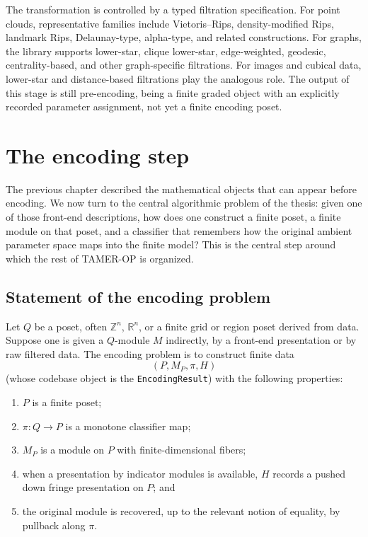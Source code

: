 \documentclass[11pt]{article}
\newcommand{\R}{\mathbb{R}}
\newcommand{\Z}{\mathbb{Z}}
\newcommand{\TAMER}{\textsc{TAMER-OP}}
\theoremstyle{definition}
\theoremstyle{remark}
\begin{document}
The transformation is controlled by a typed filtration specification.  For point clouds, representative families include Vietoris--Rips, density-modified Rips, landmark Rips, Delaunay-type, alpha-type, and related constructions.  For graphs, the library supports lower-star, clique lower-star, edge-weighted, geodesic, centrality-based, and other graph-specific filtrations.  For images and cubical data, lower-star and distance-based filtrations play the analogous role.  The output of this stage is still pre-encoding, being a finite graded object with an explicitly recorded parameter assignment, not yet a finite encoding poset.

\section{The encoding step}\label{sec:encoding}

The previous chapter described the mathematical objects that can appear before encoding.  We now turn to the central algorithmic problem of the thesis: given one of those front-end descriptions, how does one construct a finite poset, a finite module on that poset, and a classifier that remembers how the original ambient parameter space maps into the finite model?  This is the central step around which the rest of \TAMER{} is organized.

\subsection{Statement of the encoding problem}

Let $Q$ be a poset, often $\Z^n$, $\R^n$, or a finite grid or region poset derived from data.  Suppose one is given a $Q$-module $M$ indirectly, by a front-end presentation or by raw filtered data.  The encoding problem is to construct finite data
\[
(P,M_P,\pi,H)
\]
(whose codebase object is the \texttt{EncodingResult}) with the following properties:
\begin{enumerate}[label=(\roman*)]
	\item $P$ is a finite poset;
	\item $\pi \colon Q \to P$ is a monotone classifier map;
	\item $M_P$ is a module on $P$ with finite-dimensional fibers;
	\item when a presentation by indicator modules is available, $H$ records a pushed down fringe presentation on $P$; and
	\item the original module is recovered, up to the relevant notion of equality, by pullback along $\pi$.
\end{enumerate}
\end{document}
